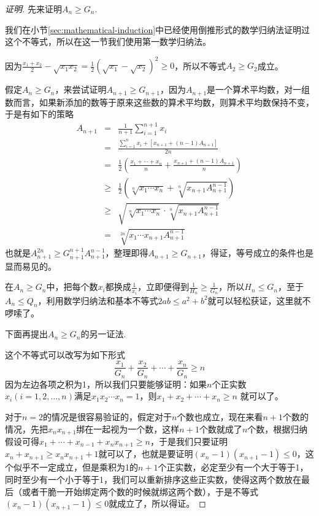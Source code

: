\begin{proof}[证明]
  先来证明$A_n\geqslant G_n$.

  我们在小节\ref{sec:mathematical-induction}中已经使用倒推形式的数学归纳法证明过这个不等式，所以在这一节我们使用第一数学归纳法。

  因为$\frac{x_1+x_2}{2}-\sqrt{x_1x_2}=\frac{1}{2}(\sqrt{x_1}-\sqrt{x_2})^2 \geqslant 0$，所以不等式$A_2 \geqslant G_2$成立。

  假定$A_n \geqslant G_n$，来尝试证明$A_{n+1} \geqslant G_{n+1}$，因为$A_{n+1}$是一个算术平均数，对一组数而言，如果新添加的数等于原来这些数的算术平均数，则算术平均数保持不变，于是有如下的策略
  \begin{eqnarray*}
    A_{n+1} &=& \frac{1}{n+1}\sum_{i=1}^{n+1}x_{i} \\
            &=& \frac{\sum_{i=1}^nx_i+[x_{n+1}+(n-1)A_{n+1}]}{2n} \\
            &=& \frac{1}{2} \left( \frac{x_1+\cdots+x_{n}}{n} + \frac{x_{n+1}+(n-1)A_{n+1}}{n} \right) \\
    & \geqslant & \frac{1}{2} \left( \sqrt[n]{x_1\cdots x_n} + \sqrt[n]{x_{n+1}A_{n+1}^{n-1}} \right) \\
            & \geqslant & \sqrt{\sqrt[n]{x_1\cdots x_n} \cdot \sqrt[n]{x_{n+1}A_{n+1}^{n-1}}} \\
    &=& \sqrt[2n]{x_1\cdots x_{n+1}A_{n+1}^{n-1}}
  \end{eqnarray*}
  也就是$A_{n+1}^{2n} \geqslant G_{n+1}^{n+1}A_{n+1}^{n-1}$，整理即得$A_{n+1} \geqslant G_{n+1}$，得证，等号成立的条件也是显而易见的。

  在$A_n \geqslant G_n$中，把每个数$x_i$都换成$\frac{1}{x_i}$，立即便得到$\frac{1}{H_n} \geqslant \frac{1}{G_n}$，所以$H_n \leqslant G_n$，至于$A_n \leqslant Q_n$，利用数学归纳法和基本不等式$2ab \leqslant a^2+b^2$就可以轻松获证，这里就不啰嗦了。

  下面再提出$A_n \geqslant G_n$的另一证法.

  这个不等式可以改写为如下形式
  \begin{equation*}
    \frac{x_1}{G_n} + \frac{x_2}{G_n} + \cdots + \frac{x_n}{G_n} \geqslant n
  \end{equation*}
  因为左边各项之积为1，所以我们只要能够证明：如果$n$个正实数$x_i(i=1,2,\ldots,n)$满足$x_1x_2\cdots x_n=1$，则$x_1+x_2+\cdots +x_n \geqslant n$ 就可以了。

  对于$n=2$的情况是很容易验证的，假定对于$n$个数也成立，现在来看$n+1$个数的情况，先把$x_nx_{n+1}$绑在一起视为一个数，这样$n+1$个数就成了$n$个数，根据归纳假设可得$x_1+\cdots + x_{n-1} + x_nx_{n+1} \geqslant n$，于是我们只要证明$x_n+x_{n+1} \geqslant x_nx_{n+1}+1$就可以了，也就是要证明$(x_n-1)(x_{n+1}-1)\leqslant 0$，这个似乎不一定成立，但是乘积为1的$n+1$个正实数，必定至少有一个大于等于1，同时至少有一个小于等于1，我们可以重新排序这些正实数，使得这两个数放在最后（或者干脆一开始绑定两个数的时候就绑这两个数），于是不等式$(x_n-1)(x_{n+1}-1)\leqslant 0$就成立了，所以得证。
\end{proof}

